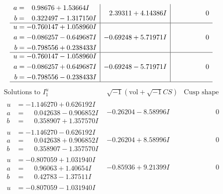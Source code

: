 \documentclass[1p]{elsarticle_modified}
\theoremstyle{definition}
\newcommand{\I}{\sqrt{-1}}
\begin{document}
$$\begin{array}{c|c|c}
\begin{aligned}
a &= \phantom{-}0.98676 + 1.53664 I \\
b &= \phantom{-}0.322497 - 1.317150 I\end{aligned}
 & \phantom{-}2.39311 + 4.14386 I & \phantom{-0.000000 } 0 \\ \hline\begin{aligned}
u &= -0.760147 + 1.058960 I \\
a &= -0.086257 - 0.649687 I \\
b &= -0.798556 + 0.238433 I\end{aligned}
 & -0.69248 + 5.71971 I & \phantom{-0.000000 } 0 \\ \hline\begin{aligned}
u &= -0.760147 - 1.058960 I \\
a &= -0.086257 + 0.649687 I \\
b &= -0.798556 - 0.238433 I\end{aligned}
 & -0.69248 - 5.71971 I & \phantom{-0.000000 } 0\\
 \hline 
 \end{array}$$\newpage$$\begin{array}{c|c|c}  
\text{Solutions to }I^u_{1}& \I (\text{vol} + \sqrt{-1}CS) & \text{Cusp shape}\\
 \hline 
\begin{aligned}
u &= -1.146270 + 0.626192 I \\
a &= \phantom{-}0.042638 - 0.906852 I \\
b &= \phantom{-}0.358907 + 1.357570 I\end{aligned}
 & -0.26204 - 8.58996 I & \phantom{-0.000000 } 0 \\ \hline\begin{aligned}
u &= -1.146270 - 0.626192 I \\
a &= \phantom{-}0.042638 + 0.906852 I \\
b &= \phantom{-}0.358907 - 1.357570 I\end{aligned}
 & -0.26204 + 8.58996 I & \phantom{-0.000000 } 0 \\ \hline\begin{aligned}
u &= -0.807059 + 1.031940 I \\
a &= \phantom{-}0.96063 + 1.40654 I \\
b &= \phantom{-}0.42783 - 1.37511 I\end{aligned}
 & -0.85936 + 9.21399 I & \phantom{-0.000000 } 0 \\ \hline\begin{aligned}
u &= -0.807059 - 1.031940 I \\

\end{aligned}
\end{array}$$
\end{document}
